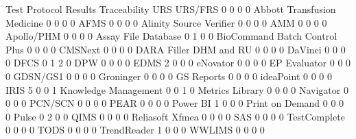 \documentclass{article}
\begin{document}
\begin{Schunk}
\begin{Soutput}
                                Test Protocol Results Traceability URS URS/FRS
                                                    0            0   0       0
  Abbott Transfusion Medicine                       0            0   0       0
  AFMS                                              0            0   0       0
  Alinity Source Verifier                           0            0   0       0
  AMM                                               0            0   0       0
  Apollo/PHM                                        0            0   0       0
  Assay File Database                               0            1   0       0
  BioCommand Batch Control Plus                     0            0   0       0
  CMSNext                                           0            0   0       0
  DARA Filler DHM and RU                            0            0   0       0
  DaVinci                                           0            0   0       0
  DFCS                                              0            1   2       0
  DPW                                               0            0   0       0
  EDMS                                              2            0   0       0
  eNovator                                          0            0   0       0
  EP Evaluator                                      0            0   0       0
  GDSN/GS1                                          0            0   0       0
  Groninger                                         0            0   0       0
  GS Reports                                        0            0   0       0
  ideaPoint                                         0            0   0       0
  IRIS                                              5            0   0       1
  Knowledge Management                              0            0   1       0
  Metrics Library                                   0            0   0       0
  Navigator                                         0            0   0       0
  PCN/SCN                                           0            0   0       0
  PEAR                                              0            0   0       0
  Power BI                                          1            0   0       0
  Print on Demand                                   0            0   0       0
  Pulse                                             0            2   0       0
  QIMS                                              0            0   0       0
  Reliasoft Xfmea                                   0            0   0       0
  SAS                                               0            0   0       0
  TestComplete                                      0            0   0       0
  TODS                                              0            0   0       0
  TrendReader                                       1            0   0       0
  WWLIMS                                            0            0   0       0
                               

\end{Soutput}
\end{Schunk}
\end{document}
